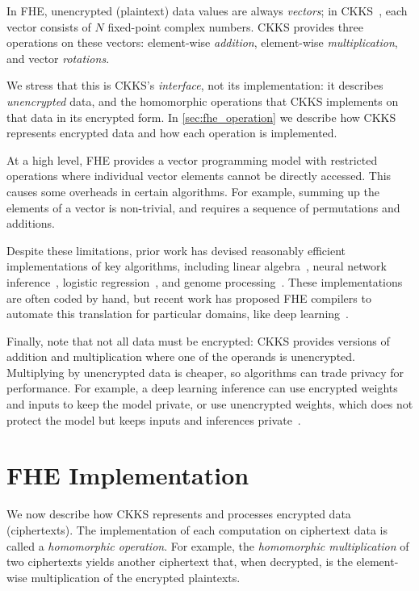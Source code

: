 In FHE, unencrypted (plaintext) data values are always \emph{vectors}; in
CKKS~\cite{brakerski:toct14:leveled}, each vector consists of $N$ fixed-point
complex numbers. CKKS provides three operations on these vectors: element-wise
\emph{addition}, element-wise \emph{multiplication}, and vector
\emph{rotations}.

We stress that this is CKKS's \emph{interface}, not its implementation: it
describes \emph{unencrypted} data, and the homomorphic operations that CKKS
implements on that data in its encrypted form.  In \autoref{sec:fhe_operation}
we describe how CKKS represents encrypted data and how each operation is
implemented.

At a high level, FHE provides a vector programming model with restricted
operations where individual vector elements cannot be directly accessed.  This
causes some overheads in certain algorithms. For example, summing up the
elements of a vector is non-trivial, and requires a sequence of permutations
and additions.

Despite these limitations, prior work has devised reasonably efficient
implementations of key algorithms, including linear
algebra~\cite{halevi:crypto14:algorithms}, neural network
inference~\cite{brutzkus:icml19:low, gilad:icml16:cryptonets}, logistic
regression~\cite{han:iacr18:efficient}, and genome
processing~\cite{blatt:nas20:secure}. These implementations are often coded by
hand, but recent work has proposed FHE compilers to automate this translation
for particular domains, like deep
learning~\cite{dathathri:pldi19:chet,dathathri:pldi20:eva}.

Finally, note that not all data must be encrypted: CKKS provides versions of
addition and multiplication where one of the operands is unencrypted.
Multiplying by unencrypted data is cheaper, so algorithms can trade privacy for
performance. For example, a deep learning inference can use encrypted weights
and inputs to keep the model private, or use unencrypted weights, which does
not protect the model but keeps inputs and inferences
private~\cite{brutzkus:icml19:low}.

\section{FHE Implementation}
\label{sec:fhe_operation}

We now describe how CKKS represents and processes encrypted data (ciphertexts).
The implementation of each computation on ciphertext data is called a
\emph{homomorphic operation}. For example, the \emph{homomorphic
multiplication} of two ciphertexts yields another ciphertext that, when
decrypted, is the element-wise multiplication of the encrypted plaintexts.

